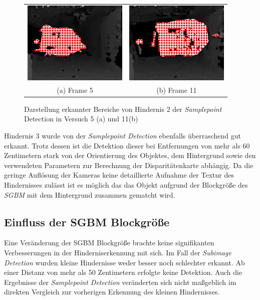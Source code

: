 \begin{figure}[h]
	\centering
	\begin{tabular}{cc}
	\includegraphics[width=5cm]{img/evaluation/sample_tiny_test_5_disparity} & 
	\includegraphics[width=5cm]{img/evaluation/sample_tiny_test_11_disparity}\\
	(a) Frame 5 &  (b) Frame 11
	\end{tabular}
	\caption{Darstellung erkannter Bereiche von Hindernis 2 der \emph{Samplepoint} Detection in Versuch 5 (a) und 11(b) }
	\label{fig:sample_eval_medium_fails}
\end{figure}

\noindent
Hindernis 3 wurde von der \emph{Samplepoint Detection} ebenfalls überraschend gut erkannt. Trotz dessen ist die Detektion dieser bei Entfernungen von mehr als 60 Zentimetern stark von der Orientierung des Objektes, dem Hintergrund sowie den verwendeten Parametern zur Berechnung der Disparitätenkarte abhängig. Da die geringe Auflösung der Kameras keine detaillierte Aufnahme der Textur des Hindernisses zulässt ist es möglich das das Objekt aufgrund der Blockgröße des \emph{SGBM} mit dem Hintergrund zusammen gematcht wird. 


\subsection{Einfluss der SGBM Blockgröße}
\noindent
Eine Veränderung der SGBM Blockgröße brachte keine signifikanten Verbesserungen in der Hinderniserkennung mit sich. Im Fall der \emph{Subimage Detection} wurden kleine Hindernisse weder besser noch schlechter erkannt. Ab einer Distanz von mehr als 50 Zentimetern erfolgte keine Detektion. Auch die Ergebnisse der \emph{Samplepoint Detection} veränderten sich nicht maßgeblich im direkten Vergleich zur vorherigen Erkennung des kleinen Hindernisses.\\ 

